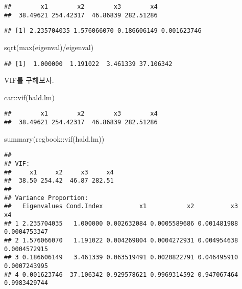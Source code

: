 \documentclass[
]{book}
\newenvironment{Shaded}{\begin{snugshade}}{\end{snugshade}}
\newcommand{\FunctionTok}[1]{\textcolor[rgb]{0.00,0.00,0.00}{#1}}
\newcommand{\NormalTok}[1]{#1}
\newcommand{\OtherTok}[1]{\textcolor[rgb]{0.56,0.35,0.01}{#1}}
\newcommand{\SpecialCharTok}[1]{\textcolor[rgb]{0.00,0.00,0.00}{#1}}
\begin{document}
\begin{verbatim}
##        x1        x2        x3        x4 
##  38.49621 254.42317  46.86839 282.51286
\end{verbatim}

\begin{Shaded}
\end{Shaded}

\begin{verbatim}
## [1] 2.235704035 1.576066070 0.186606149 0.001623746
\end{verbatim}

\begin{Shaded}
\begin{Highlighting}[]
\FunctionTok{sqrt}\NormalTok{(}\FunctionTok{max}\NormalTok{(eigenval)}\SpecialCharTok{/}\NormalTok{eigenval)}
\end{Highlighting}
\end{Shaded}

\begin{verbatim}
## [1]  1.000000  1.191022  3.461339 37.106342
\end{verbatim}

VIF를 구해보자.

\begin{Shaded}
\begin{Highlighting}[]
\NormalTok{car}\SpecialCharTok{::}\FunctionTok{vif}\NormalTok{(hald.lm)}
\end{Highlighting}
\end{Shaded}

\begin{verbatim}
##        x1        x2        x3        x4 
##  38.49621 254.42317  46.86839 282.51286
\end{verbatim}

\begin{Shaded}
\begin{Highlighting}[]
\FunctionTok{summary}\NormalTok{(regbook}\SpecialCharTok{::}\FunctionTok{vif}\NormalTok{(hald.lm))}
\end{Highlighting}
\end{Shaded}

\begin{verbatim}
## 
## VIF:
##     x1     x2     x3     x4 
##  38.50 254.42  46.87 282.51 
## 
## Variance Proportion:
##   Eigenvalues Cond.Index          x1           x2          x3           x4
## 1 2.235704035   1.000000 0.002632084 0.0005589686 0.001481988 0.0004753347
## 2 1.576066070   1.191022 0.004269804 0.0004272931 0.004954638 0.0004572915
## 3 0.186606149   3.461339 0.063519491 0.0020822791 0.046495910 0.0007243995
## 4 0.001623746  37.106342 0.929578621 0.9969314592 0.947067464 0.9983429744
\end{verbatim}
\end{document}

